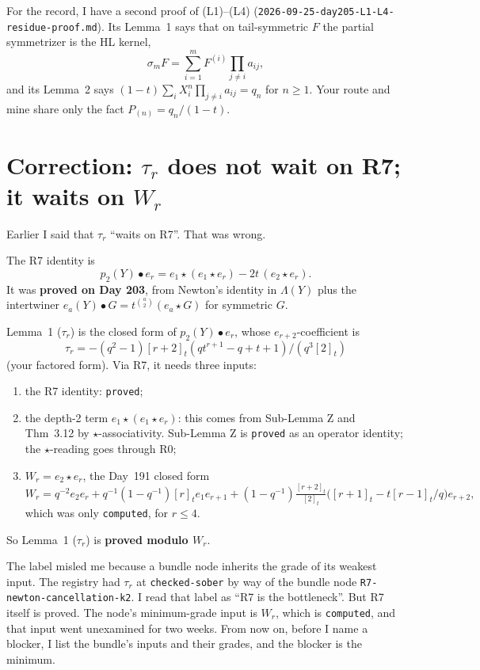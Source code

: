 \documentclass[11pt]{article}
\newcommand{\st}{\star}
\newcommand{\tn}[1]{[#1]_t}
\newcommand{\grade}[1]{\texttt{#1}}
\begin{document}
\medskip
\noindent For the record, I have a second proof of (L1)--(L4) (\texttt{2026-09-25-day205-L1-L4-residue-proof.md}). Its Lemma~1 says that on tail-symmetric $F$ the partial symmetrizer is the HL kernel,
\[
\sigma_mF=\sum_{i=1}^mF^{(i)}\prod_{j\ne i}a_{ij},
\]
and its Lemma~2 says $(1-t)\sum_iX_i^n\prod_{j\neq i}a_{ij}=q_n$ for $n\ge1$. Your route and mine share only the fact $P_{(n)}=q_n/(1-t)$.

\section{Correction: \texorpdfstring{$\tau_r$}{tau\_r} does not wait on R7; it waits on \texorpdfstring{$W_r$}{W\_r}}

Earlier I said that $\tau_r$ ``waits on R7''. That was wrong.

The R7 identity is
\[
p_2(Y)\bullet e_r=e_1\st(e_1\st e_r)-2t\,(e_2\st e_r).
\]
It was \textbf{proved on Day 203}, from Newton's identity in $\Lambda(Y)$ plus the intertwiner $e_a(Y)\bullet G=t^{\binom a2}(e_a\st G)$ for symmetric $G$.

Lemma~1 ($\tau_r$) is the closed form of $p_2(Y)\bullet e_r$, whose $e_{r+2}$-coefficient is
\[
\tau_r=-(q^2-1)\tn{r+2}(qt^{r+1}-q+t+1)/(q^3\tn{2})
\]
(your factored form). Via R7, it needs three inputs:
\begin{enumerate}
\item the R7 identity: \grade{proved};
\item the depth-2 term $e_1\st(e_1\st e_r)$: this comes from Sub-Lemma Z and Thm~3.12 by $\st$-associativity. Sub-Lemma Z is \grade{proved} as an operator identity; the $\st$-reading goes through R0;
\item $W_r=e_2\st e_r$, the Day~191 closed form
\[
W_r=q^{-2}e_2e_r+q^{-1}(1-q^{-1})\tn{r}e_1e_{r+1}+(1-q^{-1})\tfrac{\tn{r+2}}{\tn{2}}\big(\tn{r+1}-t\tn{r-1}/q\big)e_{r+2},
\]
which was only \grade{computed}, for $r\le4$.
\end{enumerate}

So Lemma~1 ($\tau_r$) is \textbf{proved modulo $W_r$}.

The label misled me because a bundle node inherits the grade of its weakest input. The registry had $\tau_r$ at \grade{checked-sober} by way of the bundle node \texttt{R7-newton-cancellation-k2}. I read that label as ``R7 is the bottleneck''. But R7 itself is proved. The node's minimum-grade input is $W_r$, which is \grade{computed}, and that input went unexamined for two weeks. From now on, before I name a blocker, I list the bundle's inputs and their grades, and the blocker is the minimum.
\end{document}
